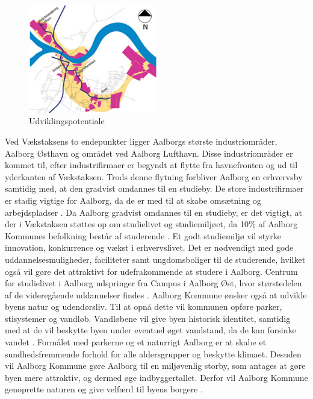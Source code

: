 \begin{figure}[htbp]
	\centering
	\includegraphics[width=0.5\textwidth]{billeder/udvikling.png}
	\caption{Udviklingspotentiale \citep{kommuneplan3}}
	\label{fig:udvikling}
\end{figure}

Ved Vækstaksens to endepunkter ligger Aalborgs største industriområder, Aalborg Østhavn og området ved Aalborg Lufthavn. Disse industriområder er kommet til, efter industrifirmaer er begyndt at flytte fra havnefronten og ud til yderkanten af Vækstaksen. Trods denne flytning forbliver Aalborg en erhvervsby samtidig med, at den gradvist omdannes til en studieby. De store industrifirmaer er stadig vigtige for Aalborg, da de er med til at skabe omsætning og arbejdspladser \citep{kommuneplan3}. 
\newline \indent{     }  Da Aalborg gradvist omdannes til en studieby, er det vigtigt, at der i Vækstaksen støttes op om studielivet og studiemiljøet, da 10\% af Aalborg Kommunes befolkning består af studerende \citep{campus}. Et godt studiemiljø vil styrke innovation, konkurrence og vækst i erhvervslivet. Det er nødvendigt med gode uddannelsesmuligheder, faciliteter samt ungdomsboliger til de studerende, hvilket også vil gøre det attraktivt for udefrakommende at studere i Aalborg. Centrum for studielivet i Aalborg udspringer fra Campus i Aalborg Øst, hvor størstedelen af de videregående uddannelser findes \citep{kommuneplan3}. 
\newline
\newline
Aalborg Kommune ønsker også at udvikle byens natur og udendørsliv. Til at opnå dette vil kommunen opføre parker, stisystemer og vandløb. Vandløbene vil give byen historisk identitet, samtidig med at de vil beskytte byen under eventuel øget vandstand, da de kan forsinke vandet \citep{kommuneplan3}. Formålet med parkerne og et naturrigt Aalborg er at skabe et sundhedsfremmende forhold for alle aldersgrupper og beskytte klimaet. Desuden vil Aalborg Kommune gøre Aalborg til en miljøvenlig storby, som antages at gøre byen mere attraktiv, og dermed øge indbyggertallet. Derfor vil Aalborg Kommune genoprette naturen og give velfærd til byens borgere \citep{kommuneplan3}.

